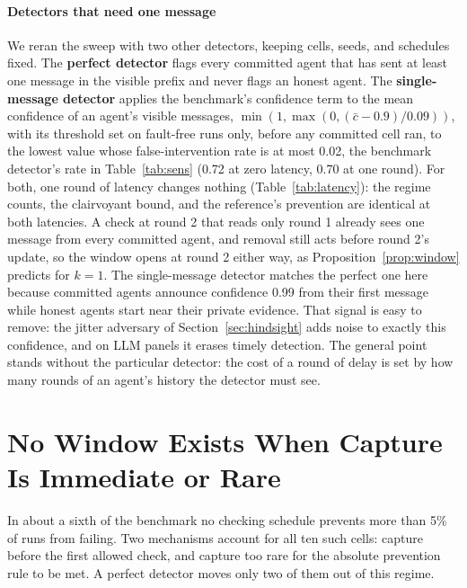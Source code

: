 \documentclass[pdflatex,sn-mathphys-num]{sn-jnl}
\theoremstyle{thmstyleone}%
\begin{document}
\paragraph{Detectors that need one message}
We reran the sweep with two other detectors, keeping cells, seeds, and schedules fixed. The \textbf{perfect detector} flags every committed agent that has sent at least one message in the visible prefix and never flags an honest agent. The \textbf{single-message detector} applies the benchmark's confidence term to the mean confidence of an agent's visible messages, $\min(1, \max(0, (\bar c - 0.9)/0.09))$, with its threshold set on fault-free runs only, before any committed cell ran, to the lowest value whose false-intervention rate is at most 0.02, the benchmark detector's rate in Table~\ref{tab:sens} (0.72 at zero latency, 0.70 at one round). For both, one round of latency changes nothing (Table~\ref{tab:latency}): the regime counts, the clairvoyant bound, and the reference's prevention are identical at both latencies. A check at round 2 that reads only round 1 already sees one message from every committed agent, and removal still acts before round 2's update, so the window opens at round 2 either way, as Proposition~\ref{prop:window} predicts for $k = 1$. The single-message detector matches the perfect one here because committed agents announce confidence 0.99 from their first message while honest agents start near their private evidence. That signal is easy to remove: the jitter adversary of Section~\ref{sec:hindsight} adds noise to exactly this confidence, and on LLM panels it erases timely detection. The general point stands without the particular detector: the cost of a round of delay is set by how many rounds of an agent's history the detector must see.

\section{No Window Exists When Capture Is Immediate or Rare}
\label{sec:ceiling}

In about a sixth of the benchmark no checking schedule prevents more than 5\% of runs from failing. Two mechanisms account for all ten such cells: capture before the first allowed check, and capture too rare for the absolute prevention rule to be met. A perfect detector moves only two of them out of this regime.
\end{document}
